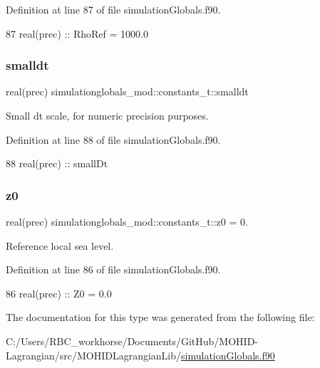 Definition at line 87 of file simulation\+Globals.\+f90.


\begin{DoxyCode}
87         \textcolor{keywordtype}{real(prec)}   :: RhoRef = 1000.0
\end{DoxyCode}
\mbox{\label{structsimulationglobals__mod_1_1constants__t_a4e417855b60f5eb0f45d3094495f532b}} 
\subsubsection{\texorpdfstring{smalldt}{smalldt}}
{\footnotesize\ttfamily real(prec) simulationglobals\+\_\+mod\+::constants\+\_\+t\+::smalldt\hspace{0.3cm}{\ttfamily [private]}}



Small dt scale, for numeric precision purposes. 



Definition at line 88 of file simulation\+Globals.\+f90.


\begin{DoxyCode}
88         \textcolor{keywordtype}{real(prec)}   :: smallDt
\end{DoxyCode}
\mbox{\label{structsimulationglobals__mod_1_1constants__t_a9dab4143c1d5fd54c8337d78ea9b7d82}} 
\subsubsection{\texorpdfstring{z0}{z0}}
{\footnotesize\ttfamily real(prec) simulationglobals\+\_\+mod\+::constants\+\_\+t\+::z0 = 0.\hspace{0.3cm}{\ttfamily [private]}}



Reference local sea level. 



Definition at line 86 of file simulation\+Globals.\+f90.


\begin{DoxyCode}
86         \textcolor{keywordtype}{real(prec)}   :: Z0 = 0.0
\end{DoxyCode}


The documentation for this type was generated from the following file\+:\begin{DoxyCompactItemize}
\item 
C\+:/\+Users/\+R\+B\+C\+\_\+workhorse/\+Documents/\+Git\+Hub/\+M\+O\+H\+I\+D-\/\+Lagrangian/src/\+M\+O\+H\+I\+D\+Lagrangian\+Lib/\mbox{\hyperlink{simulation_globals_8f90}{simulation\+Globals.\+f90}}\end{DoxyCompactItemize}
